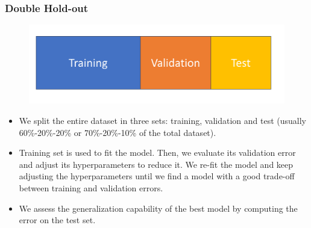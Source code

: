 \documentclass{beamer}
\begin{document}
	\begin{frame}
		\frametitle{Double Hold-out}
		\begin{figure}
			\centering
			\includegraphics[scale=0.3]{images/hold-out}
		\end{figure}
		\begin{itemize}
			\item We split the entire dataset in three sets: training, validation and test (usually 60\%-20\%-20\% or  70\%-20\%-10\% of the total dataset). 
			\item Training set is used to fit the model. Then, we evaluate its validation error and adjust its hyperparameters to reduce it. We re-fit the model and keep adjusting the hyperparameters until we find a model with a good trade-off between training and validation errors.
			\item We assess the generalization capability of the best model by computing the error on the test set.
		\end{itemize}	
	\end{frame}
\end{document}

